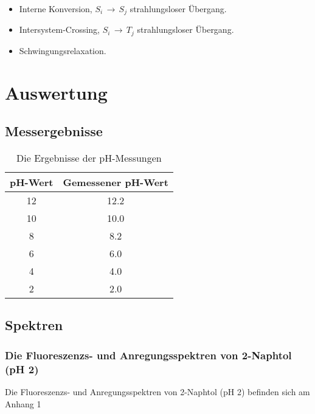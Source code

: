 \documentclass[12pt]{article}
\begin{document}
\begin{itemize}
  \item[]  Interne Konversion,
    $S_i\,\longrightarrow\,S_j$ strahlungsloser Übergang.

  \item[]  Intersystem-Crossing,
    $S_i\,\longrightarrow\,T_j$ strahlungsloser Übergang.

  \item[]  
    Schwingungsrelaxation.
\end{itemize}


\section{Auswertung}
\subsection{Messergebnisse}
\begin{table}[!ht]
  \begin{tabular}{cc}
    pH-Wert & Gemessener pH-Wert   \\
    \hline
    12 &  12.2    \\
    10 &  10.0 \\
    8  &   8.2  \\
    6  &   6.0 \\
    4  &   4.0  \\
    2  &   2.0  \\
  \end{tabular}
  \caption{ Die Ergebnisse der pH-Messungen}
\end{table}
\subsection{Spektren}
\subsubsection{Die Fluoreszenzs- und Anregungsspektren von 2-Naphtol (pH 2)}
Die Fluoreszenzs- und Anregungsspektren von 2-Naphtol (pH 2) befinden sich am Anhang 1
\end{document}
